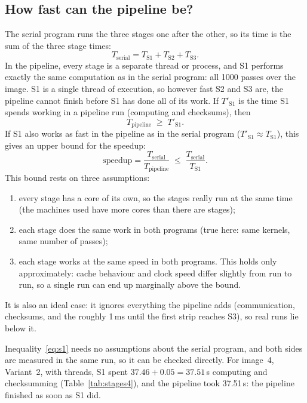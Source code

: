\documentclass[11pt,a4paper]{article}
\newcommand{\cfgIterations}{1000}
\begin{document}
\subsection{How fast can the pipeline be?}
The serial program runs the three stages one after the other, so its time is the sum of the
three stage times:
\[
  T_\text{serial} = T_\text{S1} + T_\text{S2} + T_\text{S3}.
\]
In the pipeline, every stage is a separate thread or process, and S1 performs exactly the same
computation as in the serial program: all \cfgIterations{} passes over the image. S1 is a single
thread of execution, so however fast S2 and S3 are, the pipeline cannot finish before S1 has done
all of its work. If $T'_\text{S1}$ is the time S1 spends working in a pipeline run (computing
and checksums), then
\begin{equation}
  T_\text{pipeline} \;\ge\; T'_\text{S1}.
  \label{eq:s1}
\end{equation}
If S1 also works as fast in the pipeline as in the serial program ($T'_\text{S1} \approx
T_\text{S1}$), this gives an upper bound for the speedup:
\begin{equation}
  \text{speedup} = \frac{T_\text{serial}}{T_\text{pipeline}}
  \;\le\; \frac{T_\text{serial}}{T_\text{S1}}.
  \label{eq:bound}
\end{equation}
This bound rests on three assumptions:
\begin{enumerate}
\item every stage has a core of its own, so the stages really run at the same time (the machines
  used have more cores than there are stages);
\item each stage does the same work in both programs (true here: same kernels, same number of
  passes);
\item each stage works at the same speed in both programs. This holds only approximately: cache
  behaviour and clock speed differ slightly from run to run, so a single run can end up marginally
  above the bound.
\end{enumerate}
It is also an ideal case: it ignores everything the pipeline adds (communication, checksums, and
the roughly 1\,ms until the first strip reaches S3), so real runs lie below it.

Inequality~\eqref{eq:s1} needs no assumptions about the serial program, and both sides are measured
in the same run, so it can be checked directly. For image~4, Variant~2, with threads,
S1 spent $37.46 + 0.05 = 37.51$\,s computing and checksumming (Table~\ref{tab:stages4}), and the
pipeline took 37.51\,s: the pipeline finished as soon as S1 did.
\end{document}
